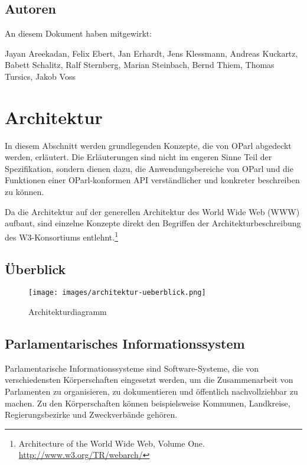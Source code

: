 \documentclass[,a4paper]{article}
\makeatletter
\def\maxwidth{\ifdim\Gin@nat@width>\linewidth\linewidth
\else\Gin@nat@width\fi}
\let\Oldincludegraphics\includegraphics
\renewcommand{\includegraphics}[1]{\Oldincludegraphics[width=\maxwidth]{#1}}
\makeatother
\begin{document}
\subsection{Autoren}\label{autoren}

An diesem Dokument haben mitgewirkt:

Jayan Areekadan, Felix Ebert, Jan Erhardt, Jens Klessmann, Andreas
Kuckartz, Babett Schalitz, Ralf Sternberg, Marian Steinbach, Bernd
Thiem, Thomas Tursics, Jakob Voss

\section{Architektur}\label{architektur}

In diesem Abschnitt werden grundlegenden Konzepte, die von OParl
abgedeckt werden, erläutert. Die Erläuterungen sind nicht im engeren
Sinne Teil der Spezifikation, sondern dienen dazu, die
Anwendungsbereiche von OParl und die Funktionen einer OParl-konformen
API verständlicher und konkreter beschreiben zu können.

Da die Architektur auf der generellen Architektur des World Wide Web
(WWW) aufbaut, sind einzelne Konzepte direkt den Begriffen der
Architekturbeschreibung des W3-Konsortiums entlehnt.\footnote{Architecture
  of the World Wide Web, Volume One. \url{http://www.w3.org/TR/webarch/}}

\subsection{Überblick}\label{uxfcberblick}

\begin{figure}[htbp]
\centering
\texttt{[image: images/architektur-ueberblick.png]}
\caption{Architekturdiagramm}
\end{figure}

\subsection{Parlamentarisches
Informationssystem}\label{parlamentarischesux5finfosystem}

Parlamentarische Informationssysteme sind Software-Systeme, die von
verschiedensten Körperschaften eingesetzt werden, um die Zusammenarbeit
von Parlamenten zu organisieren, zu dokumentieren und öffentlich
nachvollziehbar zu machen. Zu den Körperschaften können beispielsweise
Kommunen, Landkreise, Regierungsbezirke und Zweckverbände gehören.
\end{document}
